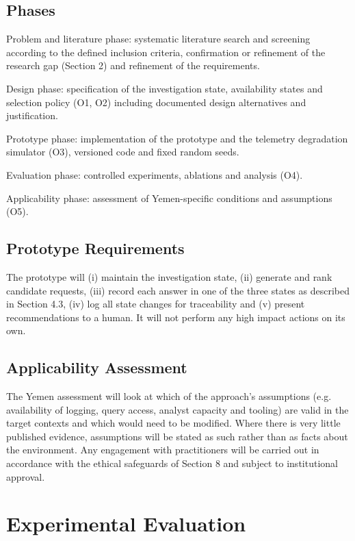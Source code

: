 \documentclass[a4paper,11pt]{article}
\begin{document}
\subsection{Phases}
Problem and literature phase: systematic literature search and screening according to the defined inclusion criteria, confirmation or refinement of the research gap (Section 2) and refinement of the requirements.\par
Design phase: specification of the investigation state, availability states and selection policy (O1, O2) including documented design alternatives and justification.\par
Prototype phase: implementation of the prototype and the telemetry degradation simulator (O3), versioned code and fixed random seeds.\par
Evaluation phase: controlled experiments, ablations and analysis (O4).\par
Applicability phase: assessment of Yemen-specific conditions and assumptions (O5).\par
\subsection{Prototype Requirements}
The prototype will (i) maintain the investigation state, (ii) generate and rank candidate requests, (iii) record each answer in one of the three states as described in Section 4.3, (iv) log all state changes for traceability and (v) present recommendations to a human. It will not perform any high impact actions on its own.\par
\subsection{Applicability Assessment}
The Yemen assessment will look at which of the approach's assumptions (e.g. availability of logging, query access, analyst capacity and tooling) are valid in the target contexts and which would need to be modified. Where there is very little published evidence, assumptions will be stated as such rather than as facts about the environment. Any engagement with practitioners will be carried out in accordance with the ethical safeguards of Section 8 and subject to institutional approval.\par
\section{Experimental Evaluation}
\end{document}
